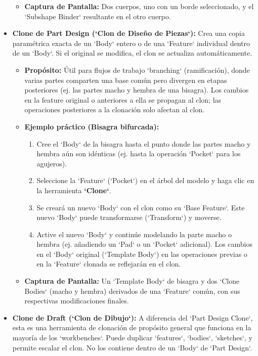 \documentclass[12pt]{article}
\begin{document}
\begin{itemize}[label=\textbullet]
\begin{itemize}[label=\textendash]
        \item \textbf{Captura de Pantalla:} Dos cuerpos, uno con un borde seleccionado, y el `Subshape Binder` resultante en el otro cuerpo.
    \end{itemize}
    \item \textbf{Clone de Part Design (`Clon de Diseño de Piezas`):} Crea una copia paramétrica exacta de un `Body` entero o de una `Feature` individual dentro de un `Body`. Si el original se modifica, el clon se actualiza automáticamente.
    \begin{itemize}[label=\textendash]
        \item \textbf{Propósito:} Útil para flujos de trabajo `branching` (ramificación), donde varias partes comparten una base común pero divergen en etapas posteriores (ej. las partes macho y hembra de una bisagra). Los cambios en la feature original o anteriores a ella se propagan al clon; las operaciones posteriores a la clonación solo afectan al clon.
        \item \textbf{Ejemplo práctico (Bisagra bifurcada):}
        \begin{enumerate}[label=\arabic*)]
            \item Cree el `Body` de la bisagra hasta el punto donde las partes macho y hembra aún son idénticas (ej. hasta la operación `Pocket` para los agujeros).
            \item Seleccione la `Feature` (`Pocket`) en el árbol del modelo y haga clic en la herramienta \textbf{`Clone`}.
            \item Se creará un nuevo `Body` con el clon como su `Base Feature`. Este nuevo `Body` puede transformarse (`Transform`) y moverse.
            \item Active el nuevo `Body` y continúe modelando la parte macho o hembra (ej. añadiendo un `Pad` o un `Pocket` adicional). Los cambios en el `Body` original (`Template Body`) en las operaciones previas o en la `Feature` clonada se reflejarán en el clon.
        \end{enumerate}
        \item \textbf{Captura de Pantalla:} Un `Template Body` de bisagra y dos `Clone Bodies` (macho y hembra) derivados de una `Feature` común, con sus respectivas modificaciones finales.
    \end{itemize}
    \item \textbf{Clone de Draft (`Clon de Dibujo`):} A diferencia del `Part Design Clone`, esta es una herramienta de clonación de propósito general que funciona en la mayoría de los `workbenches`. Puede duplicar `features`, `bodies`, `sketches`, y permite escalar el clon. No los contiene dentro de un `Body` de `Part Design`.

\end{itemize}
\end{document}
